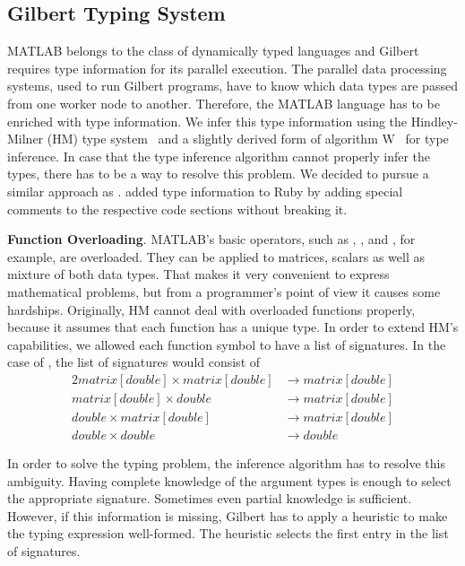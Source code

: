 \subsection{Gilbert Typing System}
\label{sec:gilberttyping}

MATLAB belongs to the class of dynamically typed languages and Gilbert requires type information for its parallel execution.
The parallel data processing systems, used to run Gilbert programs, have to know which data types are passed from one worker node to another.
Therefore, the MATLAB language has to be enriched with type information. We infer this type information using the Hindley-Milner (HM) type system~\cite{hindley:tams1969a,milner:jcss1978a} and a slightly derived form of algorithm W~\cite{damas:1982a} for type inference. In case that the type inference algorithm cannot properly infer the types, there has to be a way to resolve this problem. We decided to pursue a similar approach as \cite{furr:2009a}. \cite{furr:2009a} added type information to Ruby by adding special comments to the respective code sections without breaking it.


\textbf{Function Overloading}. MATLAB's basic operators, such as \code{+}, \code{-}, \code{/} and \code{*}, for example, are overloaded.
They can be applied to matrices, scalars as well as mixture of both data types.
That makes it very convenient to express mathematical problems, but from a programmer's point of view it causes some hardships.
Originally, HM cannot deal with overloaded functions properly, because it assumes that each function has a unique type.
In order to extend HM's capabilities, we allowed each function symbol to have a list of signatures.
In the case of \code{+}, the list of signatures would consist of 
\begin{alignat*}{2}
matrix[double] \times matrix[double] &\rightarrow matrix[double]\\
matrix[double] \times double &\rightarrow matrix[double]\\
double \times matrix[double] &\rightarrow matrix[double]\\
double \times double &\rightarrow double
\end{alignat*}

In order to solve the typing problem, the inference algorithm has to resolve this ambiguity.
Having complete knowledge of the argument types is enough to select the appropriate signature.
Sometimes even partial knowledge is sufficient.
However, if this information is missing, Gilbert has to apply a heuristic to make the typing expression well-formed.
The heuristic selects the first entry in the list of signatures.

